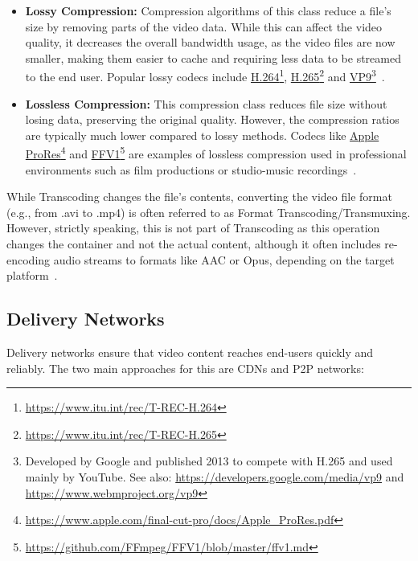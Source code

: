 \begin{itemize}
    \item \textbf{Lossy Compression:} Compression algorithms of this class reduce a file's size by removing parts of the video data. 
    While this can affect the video quality, it decreases the overall bandwidth usage, as the video files are now smaller, making them easier to cache and requiring less data to be streamed to the end user. Popular lossy codecs include \href{https://www.itu.int/rec/T-REC-H.264}{H.264}\footnote{\url{https://www.itu.int/rec/T-REC-H.264}}, \href{https://www.itu.int/rec/T-REC-H.265}{H.265}\footnote{\url{https://www.itu.int/rec/T-REC-H.265}} and \href{https://developers.google.com/media/vp9}{VP9}\footnote{Developed by Google and published 2013 to compete with H.265 and used mainly by YouTube. See also: \url{https://developers.google.com/media/vp9} and \url{https://www.webmproject.org/vp9}}~\parencite{combression}.
    \item \textbf{Lossless Compression:} This compression class reduces file size without losing data, preserving the original quality. However, the compression ratios are typically much lower compared to lossy methods. Codecs like \href{https://www.apple.com/final-cut-pro/docs/Apple_ProRes.pdf}{Apple ProRes}\footnote{\url{https://www.apple.com/final-cut-pro/docs/Apple_ProRes.pdf}} and \href{https://github.com/FFmpeg/FFV1/blob/master/ffv1.md}{FFV1}\footnote{\url{https://github.com/FFmpeg/FFV1/blob/master/ffv1.md}} are examples of lossless compression used in professional environments such as film productions or studio-music recordings~\parencite{combression}.
\end{itemize}

While Transcoding changes the file's contents, converting the video file format (e.g., from .avi to .mp4) is often referred to as Format Transcoding/Transmuxing. However, strictly speaking, this is not part of Transcoding as this operation changes the container and not the actual content, although it often includes re-encoding audio streams to formats like AAC or Opus, depending on the target platform~\parencite{transcoding}.

\subsection{Delivery Networks}
Delivery networks ensure that video content reaches end-users quickly and reliably. The two main approaches for this are \ac{CDN}s and \ac{P2P} networks:

